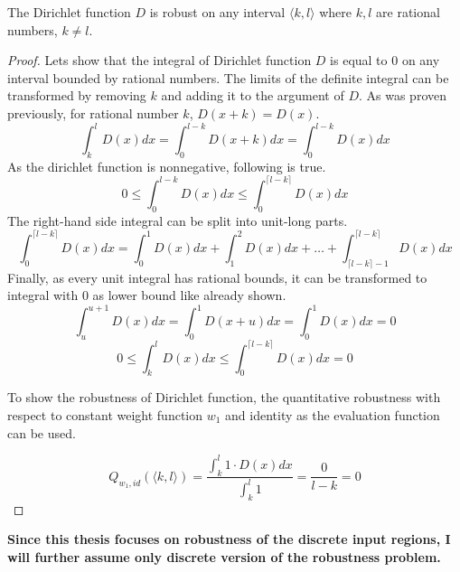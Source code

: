 \begin{lemma}{The Dirichlet function $D$ is robust on any interval $\langle k, l\rangle$
    where $k, l$ are rational numbers, $k\neq l$.}
\begin{proof}

        Lets show that the integral of Dirichlet function $D$ is equal
        to $0$ on any interval bounded by rational numbers.
        The limits of the definite integral can be transformed by removing $k$
        and adding it to the argument of $D$. As was proven previously,
        for rational number $k$, $D(x+k) = D(x)$.
        \begin{equation*}
            \int_{k}^{l} D(x) dx = \int_{0}^{l-k} D(x+k) dx = \int_{0}^{l-k} D(x) dx
        \end{equation*}
        As the dirichlet function is nonnegative, following is true.
        \begin{equation*}
            0 \leq \int_0^{l-k} D(x) dx \leq \int_0^{\lceil l-k \rceil} D(x) dx
        \end{equation*}
        The right-hand side integral can be split into unit-long parts.
        \begin{equation*}
            \int_0^{\lceil l-k\rceil} D(x) dx
            = \int_0^1 D(x) dx + \int_1^2 D(x) dx + \ldots
                + \int_{\lceil l-k \rceil-1}^{\lceil l-k \rceil} D(x) dx
        \end{equation*}
        Finally, as every unit integral has rational bounds,
        it can be transformed to integral with 0 as lower bound like already shown.
        \begin{equation*}
            \int_u^{u+1} D(x) dx = \int_0^1 D(x+u) dx = \int_0^1 D(x) dx = 0
        \end{equation*}
        \begin{equation*}
            0 \leq \int_{k}^{l} D(x) dx \leq \int_0^{\lceil l-k \rceil} D(x) dx = 0
        \end{equation*}

        To show the robustness of Dirichlet function, the quantitative robustness
        with respect to constant weight function $w_1$
        and identity as the evaluation function can be used.

        \begin{equation*}
            Q_{w_1, id}(\langle k, l\rangle)
            = \frac{\int_{k}^{l} 1\cdot D(x) dx}{\int_{k}^{l} 1} = \frac{0}{l-k} = 0
        \end{equation*}
    \end{proof}
\end{lemma}

\noindent\textbf{%
Since this thesis focuses on robustness of the discrete input regions,
I will further assume only discrete version of the robustness problem.%
}

